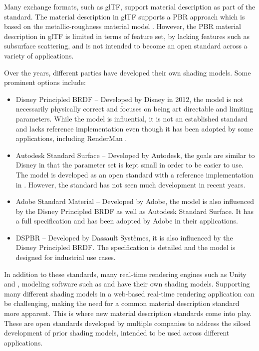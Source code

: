 Many exchange formats, such as \gls{glTF}, support material description as part of the standard. The material description in \gls{glTF} supports a \gls{PBR} approach which is based on the metallic-roughness material model \cite{gltfSpecification}. However, the \gls{PBR} material description in \gls{glTF} is limited in terms of feature set, by lacking features such as subsurface scattering, and is not intended to become an open standard across a variety of applications.

Over the years, different parties have developed their own shading models. Some prominent options include:

\begin{itemize}
    \item{Disney Principled BRDF} \cite{disney2012pbr} – Developed by Disney in 2012, the model is not necessarily physically correct and focuses on being art directable and limiting parameters. While the model is influential, it is not an established standard and lacks reference implementation even though it has been adopted by some applications, including \gls{RenderMan} \cite{renderManDisneyPbrDocs}.
    \item{Autodesk Standard Surface} \cite{autodeskStandardSurface} – Developed by Autodesk, the goals are similar to Disney in that the parameter set is kept small in order to be easier to use. The model is developed as an open standard with a reference implementation in . However, the standard has not seen much development in recent years.
    \item{Adobe Standard Material} \cite{adobeStandardMaterial} – Developed by Adobe, the model is also influenced by the Disney Principled BRDF as well as Autodesk Standard Surface. It has a full specification and has been adopted by Adobe in their applications.
    \item{\gls{DSPBR}} \cite{dspbrModel} – Developed by Dassault Systèmes, it is also influenced by the Disney Principled BRDF. The specification is detailed and the model is designed for industrial use cases.
\end{itemize}

In addition to these standards, many real-time rendering engines such as \gls{Unity} and , modeling software such as  and  have their own shading models. Supporting many different shading models in a web-based real-time rendering application can be challenging, making the need for a common material description standard more apparent. This is where new material description standards come into play. These are open standards developed by multiple companies to address the siloed development of prior shading models, intended to be used across different applications.

